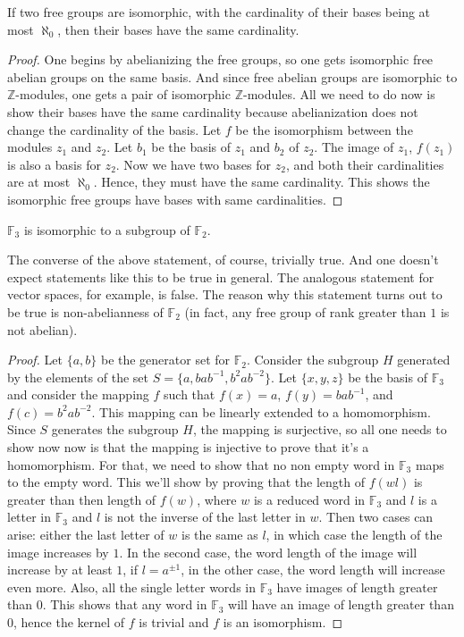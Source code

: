 \begin{thm}\label{conv}
If two free groups are isomorphic, with the cardinality of their bases being at most $\aleph_0$, then their bases have the same cardinality.
\end{thm}

\begin{proof}
One begins by abelianizing the free groups, so one gets isomorphic free abelian groups on the same basis. And since free abelian groups are isomorphic to $\mathbb{Z}$-modules, one gets a pair of isomorphic $\mathbb{Z}$-modules. All we need to do now is show their bases have the same cardinality because abelianization does not change the cardinality of the basis. Let $f$ be the isomorphism between the modules $z_1$ and $z_2$. Let $b_1$ be the basis of $z_1$ and $b_2$ of $z_2$. The image of $z_1$, $f(z_1)$ is also a basis for $z_2$. Now we have two bases for $z_2$, and both their cardinalities are at most $\aleph_0$. Hence, they must have the same cardinality. This shows the isomorphic free groups have bases with same cardinalities.
\end{proof}

\begin{thm}\cite{meier}
$\mathbb{F}_3$ is isomorphic to a subgroup of $\mathbb{F}_2$.
\end{thm}
The converse of the above statement, of course, trivially true. And one doesn't expect statements like this to be true in general. The analogous statement for vector spaces, for example, is false. The reason why this statement turns out to be true is non-abelianness of $\mathbb{F}_2$ (in fact, any free group of rank greater than $1$ is not abelian).
\begin{proof}
Let $\{a,b\}$ be the generator set for $\mathbb{F}_2$. Consider the subgroup $H$ generated by the elements of the set $S = \{a, bab^{-1}, b^2ab^{-2}\}$. Let $\{x,y,z\}$ be the basis of $\mathbb{F}_3$ and consider the mapping $f$ such that $f(x)=a$, $f(y)=bab^{-1}$, and $f(c) = b^2ab^{-2}$. This mapping can be linearly extended to a homomorphism. Since $S$ generates the subgroup $H$, the mapping is surjective, so all one needs to show now now is that the mapping is injective to prove that it's a homomorphism. For that, we need to show that no non empty word in $\mathbb{F}_3$ maps to the empty word. This we'll show by proving that the length of $f(wl)$ is greater than then length of $f(w)$, where $w$ is a reduced word in $\mathbb{F}_3$ and $l$ is a letter in $\mathbb{F}_3$ and $l$ is not the inverse of the last letter in $w$. Then two cases can arise: either the last letter of $w$ is the same as $l$, in which case the length of the image increases by $1$. In the second case, the word length of the image will increase by at least $1$, if $l=a^{\pm 1}$, in the other case, the word length will increase even more. Also, all the single letter words in $\mathbb{F}_3$ have images of length greater than $0$. This shows that any word in $\mathbb{F}_3$ will have an image of length greater than $0$, hence the kernel of $f$ is trivial and $f$ is an isomorphism.
\end{proof}

